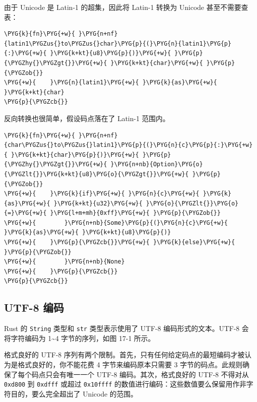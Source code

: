由于 Unicode 是 Latin-1 的超集，因此将 Latin-1 转换为 Unicode 甚至不需要查表：

\begin{Verbatim}[commandchars=\\\{\},breaklines=true,breakanywhere=true,fontsize=\codefont,xleftmargin=17bp]
\PYG{k}{fn}\PYG{+w}{ }\PYG{n+nf}{latin1\PYGZus{}to\PYGZus{}char}\PYG{p}{(}\PYG{n}{latin1}\PYG{p}{:}\PYG{+w}{ }\PYG{k+kt}{u8}\PYG{p}{)}\PYG{+w}{ }\PYG{p}{\PYGZhy{}\PYGZgt{}}\PYG{+w}{ }\PYG{k+kt}{char}\PYG{+w}{ }\PYG{p}{\PYGZob{}}
\PYG{+w}{    }\PYG{n}{latin1}\PYG{+w}{ }\PYG{k}{as}\PYG{+w}{ }\PYG{k+kt}{char}
\PYG{p}{\PYGZcb{}}
\end{Verbatim}

反向转换也很简单，假设码点落在了 Latin-1 范围内。

\begin{Verbatim}[commandchars=\\\{\},breaklines=true,breakanywhere=true,fontsize=\codefont,xleftmargin=17bp]
\PYG{k}{fn}\PYG{+w}{ }\PYG{n+nf}{char\PYGZus{}to\PYGZus{}latin1}\PYG{p}{(}\PYG{n}{c}\PYG{p}{:}\PYG{+w}{ }\PYG{k+kt}{char}\PYG{p}{)}\PYG{+w}{ }\PYG{p}{\PYGZhy{}\PYGZgt{}}\PYG{+w}{ }\PYG{n+nb}{Option}\PYG{o}{\PYGZlt{}}\PYG{k+kt}{u8}\PYG{o}{\PYGZgt{}}\PYG{+w}{ }\PYG{p}{\PYGZob{}}
\PYG{+w}{    }\PYG{k}{if}\PYG{+w}{ }\PYG{n}{c}\PYG{+w}{ }\PYG{k}{as}\PYG{+w}{ }\PYG{k+kt}{u32}\PYG{+w}{ }\PYG{o}{\PYGZlt{}}\PYG{o}{=}\PYG{+w}{ }\PYG{l+m+mh}{0xff}\PYG{+w}{ }\PYG{p}{\PYGZob{}}
\PYG{+w}{        }\PYG{n+nb}{Some}\PYG{p}{(}\PYG{n}{c}\PYG{+w}{ }\PYG{k}{as}\PYG{+w}{ }\PYG{k+kt}{u8}\PYG{p}{)}
\PYG{+w}{    }\PYG{p}{\PYGZcb{}}\PYG{+w}{ }\PYG{k}{else}\PYG{+w}{ }\PYG{p}{\PYGZob{}}
\PYG{+w}{        }\PYG{n+nb}{None}
\PYG{+w}{    }\PYG{p}{\PYGZcb{}}
\PYG{p}{\PYGZcb{}}
\end{Verbatim}

\subsection{UTF-8 编码}

Rust 的 \texttt{String} 类型和 \texttt{str} 类型表示使用了 UTF-8 编码形式的文本。UTF-8 会将字符编码为 1\textasciitilde{}4 字节的序列，如图 17-1 所示。


格式良好的 UTF-8 序列有两个限制。首先，只有任何给定码点的最短编码才被认为是格式良好的，你不能花费 4 字节来编码原本只需要 3 字节的码点。此规则确保了每个码点只会有唯一一个 UTF-8 编码。其次，格式良好的 UTF-8 不得对从 \texttt{0xd800} 到 \texttt{0xdfff} 或超过 \texttt{0x10ffff} 的数值进行编码：这些数值要么保留用作非字符目的，要么完全超出了 Unicode 的范围。

